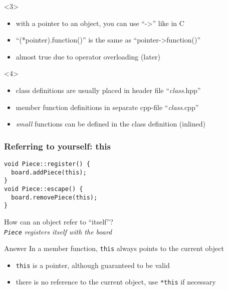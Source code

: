 \documentclass{slides}
\begin{document}
\begin{frame}[fragile]
  \begin{onlyenv}<3>
    \begin{itemize}
    \item with a pointer to an object, you can use ``->'' like in C
    \item ``(*pointer).function()'' is the same as ``pointer->function()''
    \item almost true due to operator overloading (later)
    \end{itemize}
  \end{onlyenv}

  \begin{onlyenv}<4>
    \begin{itemize}
    \item class definitions are usually placed in header file ``\textit{class}.hpp''
    \item member function definitions in separate cpp-file ``\textit{class}.cpp''
    \item \emph{small} functions can be defined in the class definition (\alert{inlined})
    \end{itemize}
  \end{onlyenv}

\end{frame}

\begin{frame}[fragile]
  \frametitle{Referring to yourself: this}

\begin{lstlisting}
void Piece::register() {
  board.addPiece(this);
}
void Piece::escape() {
  board.removePiece(this);
}
\end{lstlisting}

  \begin{block}{}
    How can an object refer to ``itself''?\\
    \emph{\lstinline!Piece! registers itself with the board}
  \end{block}

  \begin{block}{Answer}
    In a member function, \lstinline!this! always points to the
    current object
  \end{block}

  \begin{itemize}
  \item \lstinline!this! is a pointer, although guaranteed to be valid
  \item there is no reference to the current object, use \lstinline!*this!
    if necessary
  \end{itemize}
\end{frame}
\end{document}
